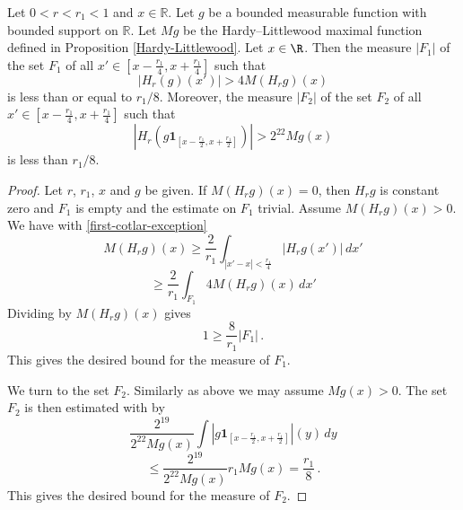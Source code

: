 \begin{lemma}
\label{Cotlar-sets}
Let $0<r<r_1<1$ and $x\in \mathbb{R}$. Let $g$ be a bounded measurable function with bounded support on $\mathbb{R}$. Let $Mg$ be the Hardy--Littlewood maximal function
defined in Proposition
\ref{Hardy-Littlewood}.
Let $x\in \R$.
Then the measure $|F_1|$ of the set $F_1$ of all $x'\in
[x-\frac{r_1}4,x+\frac{r_1}4]$ such that
\begin{equation}
\label{first-cotlar-exception}
    |H_{r}(g)(x')|>4M(H_{r}g)(x)
\end{equation}
is less than or equal to $r_1/8$.
Moreover, the measure $|F_2|$ of the set $F_2$ of all $x'\in
[x-\frac{r_1}4,x+\frac{r_1}4]$ such that
\begin{equation}
\label{second-cotlar-exception}
    |H_{r}(g\mathbf{1}_{[x-\frac {r_1} 2,x+\frac {r_1}2]})|>2^{22}Mg(x)
\end{equation}
is less than $r_1/8$.
\end{lemma}

\begin{proof}
Let $r$, $r_1$, $x$ and $g$ be given.
If $M(H_{r}g)(x)=0$, then $H_{r}g$ is constant zero
and $F_1$ is empty and the estimate on $F_1$ trivial.
Assume $M(H_{r}g)(x)>0$.
We have with \eqref{first-cotlar-exception}
\begin{equation}
    M(H_{r}g)(x)\ge
    \frac 2{r_1}\int_{|x'-x|<\frac {r_1}4}|H_{r}g(x')|\, dx'
\end{equation}
\begin{equation}
    \ge
    \frac 2{r_1}\int_{F_1} 4 M(H_{r}g)(x)\, dx'
\end{equation}
Dividing by $M(H_{r}g)(x)$ gives
\begin{equation}
    1\ge \frac 8{r_1} |F_1|\, .
\end{equation}
This gives the desired bound for the measure of $F_1$.

We turn to the set $F_2$. Similarly as above we may assume $Mg(x)>0$.
The set $F_2$ is then estimated with 
by
\begin{equation}
   \frac {2^{19}}{2^{22}Mg(x)}\int |g\mathbf{1}_{[x-\frac {r_1}2, x+\frac {r_1}2]}|(y)\, dy
\end{equation}
\begin{equation}
   \le \frac {2^{19}}{2^{22}Mg(x)}r_1Mg(x)= \frac {r_1}8\,.
\end{equation}
This gives the desired bound for the measure of $F_2$.
\end{proof}

